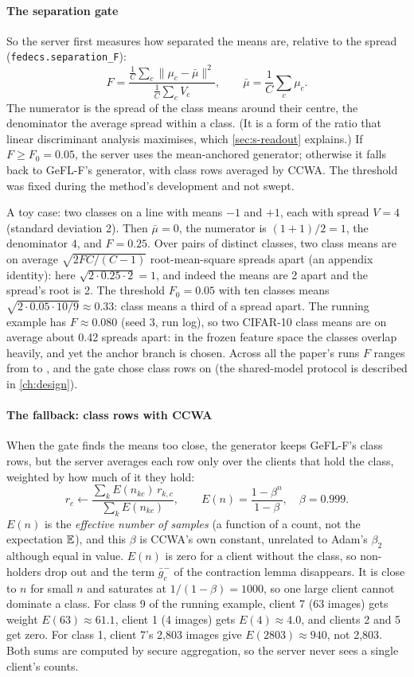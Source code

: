 \paragraph{The separation gate} So the server first measures how separated the means are, relative to the spread
(\texttt{fedecs.separation\_F}):
\[
F=\frac{\frac1C\sum_c\|\mu_c-\bar\mu\|^2}{\frac1C\sum_c V_c},\qquad \bar\mu=\frac1C\sum_c\mu_c .
\]
The numerator is the spread of the class means around their centre, the denominator the average spread within a
class. (It is a form of the ratio that linear discriminant analysis maximises, which \cref{sec:s-readout} explains.)
If $F\ge F_0=0.05$, the server uses the mean-anchored generator; otherwise it falls back to GeFL-F's generator, with
class rows averaged by CCWA. The threshold was fixed during the method's development and not swept.

A toy case: two classes on a line with means $-1$ and $+1$, each with spread $V=4$ (standard deviation 2). Then
$\bar\mu=0$, the numerator is $(1+1)/2=1$, the denominator $4$, and $F=0.25$. Over pairs of distinct classes, two
class means are on average $\sqrt{2FC/(C-1)}$ root-mean-square spreads apart (an appendix identity): here
$\sqrt{2\cdot0.25\cdot2}=1$, and indeed the means are 2 apart and the spread's root is 2. The threshold $F_0=0.05$ with
ten classes means $\sqrt{2\cdot0.05\cdot10/9}\approx0.33$: class means a third of a spread apart. The running example
has $F\approx0.080$ (seed 3, run log), so two CIFAR-10 class means are on average about 0.42 spreads apart: in the
frozen feature space the classes overlap heavily, and yet the anchor branch is chosen. Across all the paper's runs $F$
ranges from  to , and the gate chose class rows on  (the
shared-model protocol is described in \cref{ch:design}).

\paragraph{The fallback: class rows with CCWA} When the gate finds the means too close, the generator keeps GeFL-F's
class rows, but the server averages each row only over the clients that hold the class, weighted by how much of it
they hold:
\[
r_c\leftarrow\frac{\sum_k E(n_{kc})\,r_{k,c}}{\sum_k E(n_{kc})},\qquad E(n)=\frac{1-\beta^n}{1-\beta},\quad\beta=0.999 .
\]
$E(n)$ is the \emph{effective number of samples} (a function of a count, not the expectation $\mathbb{E}$), and this $\beta$
is CCWA's own constant, unrelated to Adam's $\beta_2$ although equal in value. $E(n)$ is zero for a client without the
class, so non-holders drop out and the term $\bar g^{-}_c$ of the contraction lemma disappears. It is close to $n$ for small
$n$ and saturates at $1/(1-\beta)=1000$, so one large client cannot dominate a class. For class 9 of the running
example, client 7 (63 images) gets weight $E(63)\approx61.1$, client 1 (4 images) gets $E(4)\approx4.0$, and clients 2
and 5 get zero. For class 1, client 7's 2,803 images give $E(2803)\approx940$, not 2,803. Both sums are computed by
secure aggregation, so the server never sees a single client's counts.

